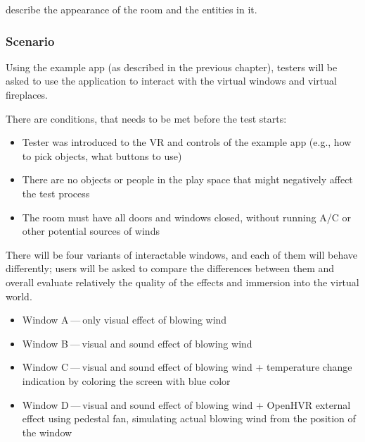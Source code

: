 \hyperlink{09-example-app}{} describe the appearance of the room and the entities in it.


\hypertarget{x-scenario}{\subsubsection*{Scenario}}
Using the example app (as described in the previous chapter), testers will
be asked to use the application to interact with the virtual windows and
virtual fireplaces.


There are conditions, that needs to be met before the test starts:


\begin{itemize}

\item Tester was introduced to the VR and controls of
the example app (e.g., how to pick objects, what buttons to use)

\item There are no objects or people in the play space that might negatively affect
the test process

\item The room must have all doors and windows closed, without running A/C
or other potential sources of winds

\end{itemize}


There will be four variants of interactable windows, and each of them will
behave differently; users will be asked to compare the differences between
them and overall evaluate relatively the quality of the effects and
immersion into the virtual world.


\begin{itemize}

\item Window A — only visual effect of blowing wind

\item Window B — visual and sound effect of blowing wind

\item Window C — visual and sound effect of blowing wind + temperature change
indication by coloring the screen with blue color

\item Window D — visual and sound effect of blowing wind + OpenHVR external effect
using pedestal fan, simulating actual blowing wind from the position of
the window

\end{itemize}



